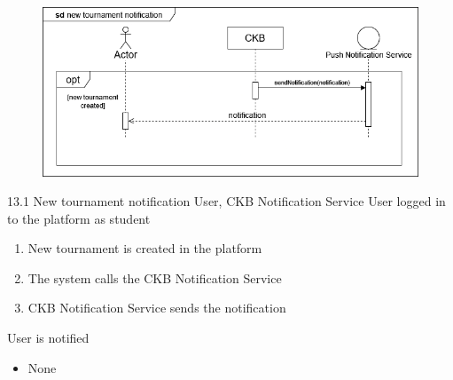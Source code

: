 \usecase
{
    \begin{figure}[H]
        \centering
        \includegraphics[width=\textwidth]{src/sequence_diagrams/notifytourn.png}
    \end{figure}
}
{13.1}
{New tournament notification} %
{User, CKB Notification Service} %
{User logged in to the platform as student} %
{ %
    \begin{enumerate}
        \item New tournament is created in the platform
        \item The system calls the CKB Notification Service
        \item CKB Notification Service sends the notification
    \end{enumerate}
}
{User is notified} %
{ %
    \begin{itemize}
        \item None
    \end{itemize}
}
{ %

}


